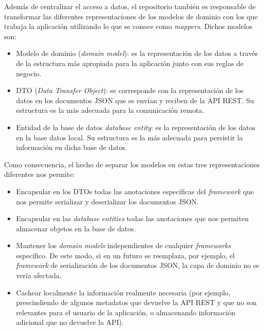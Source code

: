 Además de centralizar el acceso a datos, el repositorio también es responsable de transformar las diferentes representaciones de los modelos de dominio con los que trabaja la aplicación utilizando lo que se conoce como \emph{mappers}. Dichos modelos son:

\vspace{-0.3cm}
\begin{itemize} [\textbullet]
	\item Modelo de dominio (\emph{domain model}): es la representación de los datos a través de la estructura más apropiada para la aplicación junto con sus reglas de negocio.
	\item DTO (\emph{Data Transfer Object}): se corresponde con la representación de los datos en los documentos JSON que se envían y reciben de la API REST. Su estructura es la más adecuada para la comunicación remota.
	\item Entidad de la base de datos \emph{database entity}: es la representación de los datos en la base datos local. Su estructura es la más adecuada para persistir la información en dicha base de datos.
\end{itemize}

Como consecuencia, el hecho de separar los modelos en estas tres representaciones diferentes nos permite:

\vspace{-0.3cm}
\begin{itemize} [\textbullet]
	\item Encapsular en los DTOs todas las anotaciones específicas del \emph{framework} que nos permite serializar y deserializar los documentos JSON.
	
	\item Encapsular en las \emph{database entities} todas las anotaciones que nos permiten almacenar objetos en la base de datos.
	
	\item Mantener los \emph{domain models} independientes de cualquier \emph{frameworks} específico. De este modo, si en un futuro se reemplaza, por ejemplo, el \emph{framework} de serialización de los documentos JSON, la capa de dominio no se vería afectada.
	
	\item Cachear localmente la información realmente necesaria (por ejemplo, prescindiendo de algunos metadatos que devuelve la API REST y que no son relevantes para el usuario de la aplicación, o almacenando información adicional que no devuelve la API).
\end{itemize}


